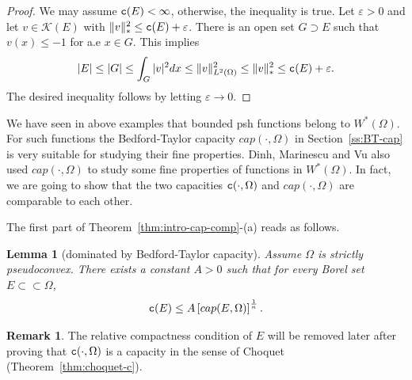 \documentclass{amsart}
\newcommand{\veps}{\varepsilon}
\newcommand{\tc}{{\tt c}}
\newcommand{\Om}{\Omega}
\newcommand{\cali}[1]{\mathscr{#1}}
\newcommand{\Kc}{\cali{K}}
\newtheorem{lem}[thm]{Lemma}
\theoremstyle{definition}
\newtheorem{remark}[thm]{Remark}
\numberwithin{thm}{section}
\numberwithin{equation}{section}
\renewcommand{\[}{\begin{equation}}
\renewcommand{\]}{\end{equation}}
\begin{document}
\begin{proof} We may assume $\tc(E)<\infty$, otherwise, the inequality is true. Let $\veps>0$ and let $v\in \Kc(E)$ with $\|v\|_*^2 \leq \tc(E) +\veps$.
There is an open set $G\supset E$ such that $v(x)\leq -1$ for a.e $x\in G$. This implies
$$
	|E| \leq |G| \leq \int_G |v|^2 dx \leq \|v\|_{L^2(\Om)}^2 \leq \|v\|_*^2 \leq \tc(E)+\veps.
$$
The desired inequality follows by letting $\veps\to 0$.
\end{proof}

We have seen in above examples that bounded psh functions belong to $W^*(\Om)$. For such functions the Bedford-Taylor capacity $cap(\cdot,\Om)$ in Section~\ref{ss:BT-cap} is very  suitable for studying their fine properties. Dinh, Marinescu and Vu \cite{DMV} also used $cap(\cdot,\Om)$ to study some fine properties of functions in $W^*(\Om)$. In fact, 
we are going to show that the two capacities $\tc (\cdot,\Om)$ and $cap(\cdot,\Om)$ are  comparable to each other.   

The first part of Theorem~\ref{thm:intro-cap-comp}-(a) reads as follows.

\begin{lem}[dominated by Bedford-Taylor capacity]  \label{lem:c-cap} Assume $\Om$ is strictly pseudoconvex. There exists a constant $A>0$ such that for every Borel set $E\subset\subset \Om$,
$$
	\tc(E) \leq A \left[cap(E,\Om)\right]^\frac{1}{n}.
$$
\end{lem}

\begin{remark}\label{rmk:inner-reg} The relative compactness condition of $E$ will be removed later after proving that $\tc(\cdot,\Om)$ is a capacity in the sense of Choquet (Theorem~\ref{thm:choquet-c}).
\end{remark}
\end{document}
